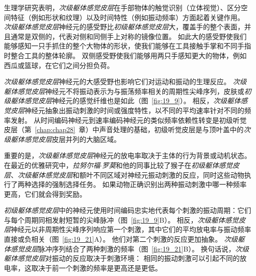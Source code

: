 生理学研究表明，\textit{次级躯体感觉皮层}在手部物体的触觉识别（立体视觉）、区分空间特征（例如形状和纹理）以及时间特性（例如振动频率）方面起着关键作用。
\textit{次级躯体感觉皮层}神经元的感受野比\textit{初级躯体感觉皮层}大，覆盖手的整个表面，并且通常是双侧的，代表对侧和同侧手上对称的镜像位置。
如此大的感受野使我们能够感知一只手抓住的整个大物体的形状，使我们能够在工具接触手掌和不同手指时整合工具的整体轮廓。
双侧感受野使我们能够用两只手感知更大的物体，例如西瓜或篮球，在它们之间分担负荷。


\textit{次级躯体感觉皮层}神经元的大感受野也影响它们对运动和振动的生理反应。
\textit{次级躯体感觉皮层}神经元不将振动表示为与振荡频率相关的周期性尖峰序列，皮肤或\textit{初级躯体感觉皮层}神经元的感觉纤维也是如此（图~\ref{fig:19_9}）。
相反，\textit{次级躯体感觉皮层}神经元抽象出振动刺激的时间或强度特性，以不同的平均速率针对不同的频率发射。
从时间编码神经元到速率编码神经元的类似频率依赖性转变是初级听觉皮层（第~\ref{chap:chap28}~章）中声音处理的基础，初级听觉皮层是与顶叶盖中的\textit{次级躯体感觉皮层}皮层并列的大脑区域。


重要的是，\textit{次级躯体感觉皮层}神经元的放电率取决于主体的行为背景或动机状态。
在最近的优雅研究中，\textit{拉努尔福$\cdot$罗莫}和他的同事比较了猴子在\textit{初级躯体感觉皮层}、\textit{次级躯体感觉皮层}和额叶不同区域对神经元振动刺激的反应，同时这些动物执行了两种选择的强制选择任务。
如果动物正确识别出两种振动刺激中哪一种频率更高，它们就会得到奖励。


\textit{初级躯体感觉皮层}中的神经元使用时间编码忠实地代表每个刺激的振动周期：它们与每个周期同相发射短暂的尖峰脉冲（图~\ref{fig:19_9}B）。
相反，\textit{次级躯体感觉皮层}神经元以非周期性尖峰序列响应第一个刺激，其中它们的平均放电率与振动频率直接或负相关（图~\ref{fig:19_21}A）。
他们对第二个刺激的反应更加抽象。
\textit{次级躯体感觉皮层}脉冲序列结合了两种刺激的频率（图~\ref{fig:19_21}B）。
换句话说，\textit{次级躯体感觉皮层}对振动的反应取决于刺激环境：
相同的振动刺激可以引起不同的放电率，这取决于前一个刺激的频率是更高还是更低。


